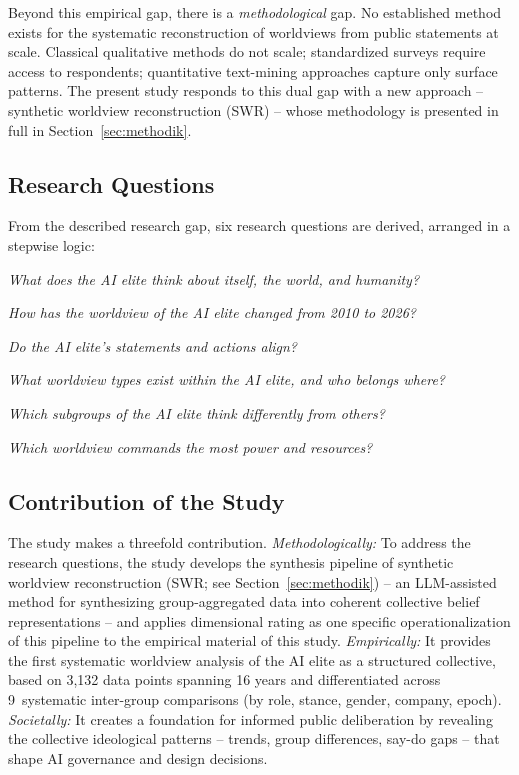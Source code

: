 \documentclass[12pt,a4paper]{article}
\begin{document}
Beyond this empirical gap, there is a \emph{methodological} gap. No established method exists for the systematic reconstruction of worldviews from public statements at scale. Classical qualitative methods do not scale; standardized surveys require access to respondents; quantitative text-mining approaches capture only surface patterns. The present study responds to this dual gap with a new approach -- synthetic worldview reconstruction (SWR) -- whose methodology is presented in full in Section~\ref{sec:methodik}.


\subsection{Research Questions}
\label{sec:einleitung:fragen}

From the described research gap, six research questions are derived, arranged in a stepwise logic:

\begin{description}[style=nextline, leftmargin=1.5cm]
  \item[RQ1: WORLDVIEW (descriptive)] \emph{What does the AI elite think about itself, the world, and humanity?}
  \item[RQ2: CHANGE (longitudinal)] \emph{How has the worldview of the AI elite changed from 2010 to 2026?}
  \item[RQ3: CONGRUENCE (validating)] \emph{Do the AI elite's statements and actions align?}
  \item[RQ4: CLUSTERS (exploratory)] \emph{What worldview types exist within the AI elite, and who belongs where?}
  \item[RQ5: DIFFERENCE (comparative)] \emph{Which subgroups of the AI elite think differently from others?}
  \item[RQ6: POWER (normative)] \emph{Which worldview commands the most power and resources?}
\end{description}


\subsection{Contribution of the Study}
\label{sec:einleitung:beitrag}

The study makes a threefold contribution. \emph{Methodologically:} To address the research questions, the study develops the synthesis pipeline of synthetic worldview reconstruction (SWR; see Section~\ref{sec:methodik}) -- an LLM-assisted method for synthesizing group-aggregated data into coherent collective belief representations -- and applies dimensional rating as one specific operationalization of this pipeline to the empirical material of this study. \emph{Empirically:} It provides the first systematic worldview analysis of the AI elite as a structured collective, based on 3,132 data points spanning 16 years and differentiated across 9~systematic inter-group comparisons (by role, stance, gender, company, epoch). \emph{Societally:} It creates a foundation for informed public deliberation by revealing the collective ideological patterns -- trends, group differences, say-do gaps -- that shape AI governance and design decisions.
\end{document}
